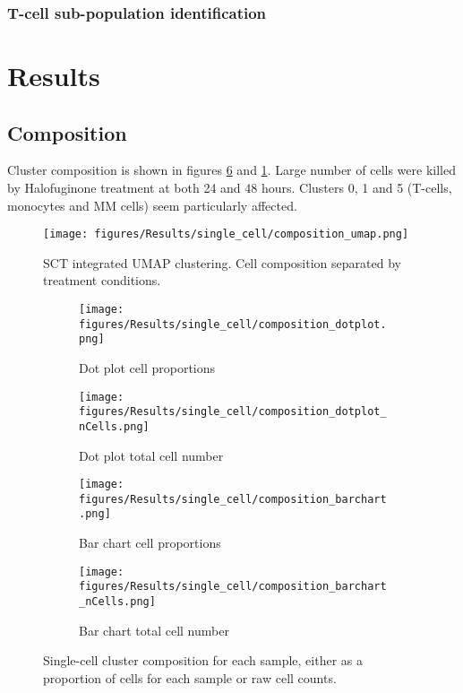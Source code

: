 \subsubsection{T-cell sub-population identification}

\section{Results}

\subsection{Composition}
Cluster composition is shown in figures \ref{fig:sc_comp_clusters} and \ref{fig:sc_umap_comp}.
Large number of cells were killed by Halofuginone treatment at both 24 and 48 hours.
Clusters 0, 1 and 5 (T-cells, monocytes and MM cells) seem particularly affected.

\begin{figure}[htb]
\centering
\texttt{[image: figures/Results/single\_cell/composition\_umap.png]}
\caption[UMAP cluster composition]{SCT integrated UMAP clustering. Cell composition separated by treatment conditions. }
\label{fig:sc_umap_comp}
\end{figure}


\begin{figure}[pt]
\begin{subfigure}[t]{0.5\textwidth}
    \texttt{[image: figures/Results/single\_cell/composition\_dotplot.png]}
    \caption{Dot plot cell proportions}
    \label{fig:comp_dot}
\end{subfigure}
\begin{subfigure}[t]{0.5\textwidth}
    \texttt{[image: figures/Results/single\_cell/composition\_dotplot\_nCells.png]}
    \caption{Dot plot total cell number}
    \label{fig:comp_dot_ncells}
\end{subfigure}
%
\medskip
\begin{subfigure}[t]{0.5\textwidth}
    \texttt{[image: figures/Results/single\_cell/composition\_barchart.png]}
    \caption{Bar chart cell proportions}
    \label{fig:comp_bar}
\end{subfigure}
\begin{subfigure}[t]{0.5\textwidth}
    \texttt{[image: figures/Results/single\_cell/composition\_barchart\_nCells.png]}
    \caption{Bar chart total cell number}
    \label{fig:comp_bar_ncells}
\end{subfigure}
%
\caption[Single-cell cluster composition]{Single-cell cluster composition for each sample, either as a proportion of cells for each sample or raw cell counts.}
\label{fig:sc_comp_clusters}
\end{figure}


